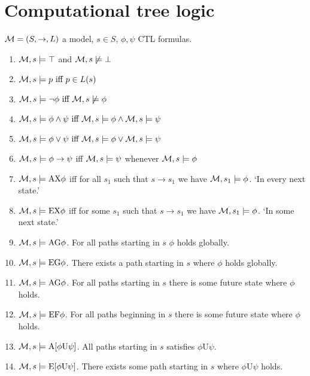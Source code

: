 \documentclass[10pt,a4paper]{article}
\begin{document}
\section*{Computational tree logic}

$\mathcal{M} = (S, \to, L)$ a model, $s \in S$, $\phi, \psi$ CTL formulas.

\begin{enumerate}
  \item $\mathcal{M}, s \models \top$ and $\mathcal{M}, s \not\models \bot$
  \item $\mathcal{M}, s \models p \text{ iff } p \in L(s)$
  \item $\mathcal{M}, s \models \neg \phi \text{ iff } \mathcal{M}, s \not\models \phi$
  \item $\mathcal{M}, s \models \phi \land \psi \text{ iff } \mathcal{M}, s \models \phi \land \mathcal{M}, s \models \psi$
  \item $\mathcal{M}, s \models \phi \lor \psi \text{ iff } \mathcal{M}, s \models \phi \lor \mathcal{M}, s \models \psi$
  \item $\mathcal{M}, s \models \phi \to \psi$ iff $\mathcal{M}, s \models \psi$ whenever $\mathcal{M}, s \models \phi$
  \item $\mathcal{M}, s \models \text{AX} \phi$ iff for all $s_1$ such that $s \to s_1$ we have $\mathcal{M}, s_1 \models \phi$. `In every next state.'
  \item $\mathcal{M}, s \models \text{EX} \phi$ iff for some $s_1$ such that $s \to s_1$ we have $\mathcal{M}, s_1 \models \phi$. `In some next state.'
  \item $\mathcal{M}, s \models \text{AG} \phi$. For all paths starting in $s$ $\phi$ holds globally.
  \item $\mathcal{M}, s \models \text{EG} \phi$. There exists a path starting in $s$ where $\phi$ holds globally.
  \item $\mathcal{M}, s \models \text{AG} \phi$. For all paths starting in $s$ there is some future state where $\phi$ holds.
  \item $\mathcal{M}, s \models \text{EF} \phi$. For all paths beginning in $s$ there is some future state where $\phi$ holds.
  \item $\mathcal{M}, s \models \text{A}[\phi \text{U} \psi]$. All paths starting in $s$ satisfies $\phi \text{U} \psi$.
  \item $\mathcal{M}, s \models \text{E}[\phi \text{U} \psi]$. There exists some path starting in $s$ where $\phi \text{U} \psi$ holds.
\end{enumerate}
\end{document}
